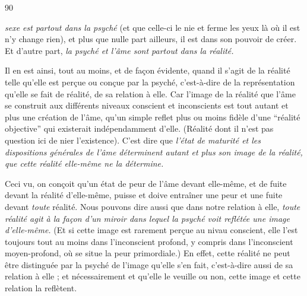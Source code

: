 90

\textit{sexe est partout dans la psyché} (et que celle-ci le nie et ferme les yeux là où il est n'y change rien), et plus que nulle part ailleurs, il est dans son pouvoir de créer. Et d'autre part, \textit{la psyché et l'âme sont partout dans la réalité.}

Il en est ainsi, tout au moins, et de façon évidente, quand il s'agit de la réalité telle qu'elle est perçue ou conçue par la psyché, c'est-à-dire de la représentation qu'elle se fait de  réalité, de sa relation à elle. Car l'image de la réalité que l'âme se construit aux différents niveaux conscient et inconscients est tout autant et plus une création de l'âme, qu'un simple reflet plus ou moins fidèle d'une ``réalité objective'' qui existerait indépendamment d'elle. (Réalité dont il n'est pas question ici de nier l'existence). C'est dire que \textit{l'état de maturité et les dispositions générales de l'âme déterminent autant et plus son image de la réalité, que cette réalité elle-même ne la détermine.}
\margin{$\cdot$}

Ceci vu, on conçoit qu'un état de peur de l'âme devant elle-même, et de fuite devant la réalité d'elle-même, puisse et doive entraîner une peur et une fuite devant \textit{toute} réalité. Nous pouvons dire aussi que dans notre relation à elle, \textit{toute réalité agit à la façon d'un \textnormal{miroir} dans lequel la psyché voit reflétée une image d'elle-même.} (Et si cette image est rarement perçue au nivau conscient, elle l'est toujours tout au moins dans l'inconscient profond, y compris dans l'inconscient moyen-profond, où se situe la peur primordiale.) En effet, cette réalité ne peut être distinguée par la psyché de l'image qu'elle s'en fait, c'est-à-dire aussi de sa relation à elle ; et nécessairement et qu'elle le veuille ou non, cette image et cette relation la reflètent.
\margin{$\cdot$}

